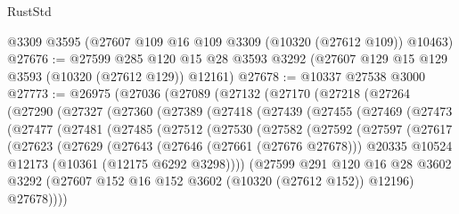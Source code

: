\begin{lexlean}{RustStd}
\begin{coremodule}
    @3309
    @3595
    (@27607 @109 @16 @109 @3309 (@10320 (@27612 @109)) @10463)
@27676 := @27599
    @285
    @120
    @15
    @28
    @3593
    @3292
    (@27607 @129 @15 @129 @3593 (@10320 (@27612 @129)) @12161)
@27678 := @10337 @27538 @3000
@27773 := @26975
    (@27036
      (@27089
        (@27132
          (@27170
            (@27218
              (@27264
                (@27290
                  (@27327
                    (@27360
                      (@27389
                        (@27418
                          (@27439
                            (@27455
                              (@27469
                                (@27473
                                  (@27477
                                    (@27481
                                      (@27485
                                        (@27512
                                          (@27530
                                            (@27582
                                              (@27592
                                                (@27597
                                                  (@27617
                                                    (@27623
                                                      (@27629
                                                        (@27643
                                                          (@27646 (@27661 (@27676 @27678)))
                                                          @20335
                                                          @10524
                                                          @12173
                                                          (@10361 (@12175 @6292 @3298))))
                                                      (@27599
                                                        @291
                                                        @120
                                                        @16
                                                        @28
                                                        @3602
                                                        @3292
                                                        (@27607
                                                          @152
                                                          @16
                                                          @152
                                                          @3602
                                                          (@10320 (@27612 @152))
                                                          @12196)
                                                        @27678))))

\end{coremodule}
\end{lexlean}
